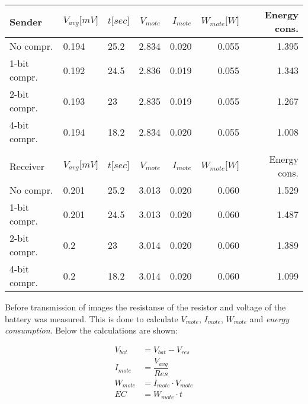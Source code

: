 \begin{tabular}{l l l r r r r}
	Sender           	& $V_{avg}\lbrack mV\rbrack$ & $t\lbrack sec\rbrack$ & $V_{mote}$  & $I_{mote}$ & $W_{mote}\lbrack W\rbrack$ & Energy cons.\\ \hline
	No compr.	 & 0.194 & 25.2 & 2.834 & 0.020 & 0.055 & 1.395 \\
	1-bit compr. & 0.192 & 24.5 & 2.836 & 0.019 & 0.055 & 1.343 \\
	2-bit compr. & 0.193 & 23   & 2.835 & 0.019 & 0.055 & 1.267 \\
	4-bit compr. & 0.194 & 18.2 & 2.834 & 0.020 & 0.055 & 1.008 \\
	
	&&&&&& \\

	Receiver           	& $V_{avg}\lbrack mV\rbrack$ & $t\lbrack sec\rbrack$ & $V_{mote}$  & $I_{mote}$ & $W_{mote}\lbrack W\rbrack$ & Energy cons.\\ \hline
	No compr.	 & 0.201 & 25.2 & 3.013 & 0.020 & 0.060 & 1.529 \\
	1-bit compr. & 0.201 & 24.5 & 3.013 & 0.020 & 0.060 & 1.487 \\
	2-bit compr. & 0.2   & 23   & 3.014 & 0.020 & 0.060 & 1.389 \\
	4-bit compr. & 0.2   & 18.2 & 3.014 & 0.020 & 0.060 & 1.099
\end{tabular}

Before transmission of images the resistanse of the resistor and voltage of the battery was measured. This is done to calculate $V_{mote}$, $I_{mote}$, $W_{mote}$ and \emph{energy consumption}. Below the calculations are shown:
 
\begin{align*}
	V_{bat}&=V_{bat}-V_{res}\\
	I_{mote}&= \dfrac{V_{avg}}{Res}\\
	W_{mote}&=I_{mote}\cdot V_{mote} \\
	EC&=W_{mote}\cdot t
\end{align*}